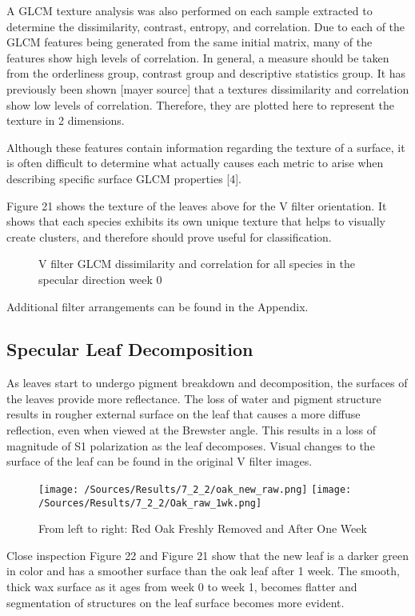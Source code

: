 A GLCM texture analysis was also performed on each sample extracted to determine the dissimilarity, contrast, entropy, and correlation. Due to each of the GLCM features being generated from the same initial matrix, many of the features show high levels of correlation.  In general, a measure should be taken from the orderliness group, contrast group and descriptive statistics group. It has previously been shown [mayer source] that a textures dissimilarity and correlation show low levels of correlation.  Therefore, they are plotted here to represent the texture in 2 dimensions.

Although these features contain information regarding the texture of a surface, it is often difficult to determine what actually causes each metric to arise when describing specific surface GLCM properties [4].

Figure 21 shows the texture of the leaves above for the V filter orientation.  It shows that each species exhibits its own unique texture that helps to visually create clusters, and therefore should prove useful for classification.
%
\begin{figure}[!htb]
    \begin{center}
    \end{center}
    \caption{V filter GLCM dissimilarity and correlation for all species in the specular direction week 0}
    \label{fig:polarization}
\end{figure}
%
Additional filter arrangements can be found in the Appendix.

\subsection{Specular Leaf Decomposition}
As leaves start to undergo pigment breakdown and decomposition, the surfaces of the leaves provide more reflectance.  The loss of water and pigment structure results in rougher external surface on the leaf that causes a more diffuse reflection, even when viewed at the Brewster angle.  This results in a loss of magnitude of S1 polarization as the leaf decomposes.  Visual changes to the surface of the leaf can be found in the original V filter images.
%
\begin{figure}[htp]
    \centering
    \hspace*{\fill}%
    \texttt{[image: /Sources/Results/7\_2\_2/oak\_new\_raw.png]}\hfill%
    \texttt{[image: /Sources/Results/7\_2\_2/Oak\_raw\_1wk.png]}
    \hspace*{\fill}%
    \caption{From left to right: Red Oak Freshly Removed and After One Week}
    \label{fig:specular-raw-decompose}
\end{figure}
%
Close inspection Figure 22 and Figure 21 show that the new leaf is a darker green in color and has a smoother surface than the oak leaf after 1 week.  The smooth, thick wax surface as it ages from week 0 to week 1, becomes flatter and segmentation of structures on the leaf surface becomes more evident.

